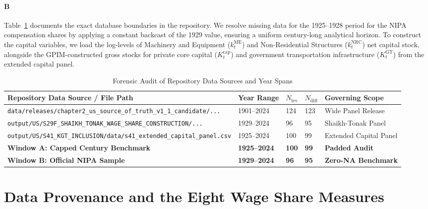\documentclass[11pt,a4paper]{article}
\begin{document}
\paragraph{B}
Table~\ref{tab:sample_audit} documents the exact database boundaries in the repository. We resolve missing data for the 1925--1928 period for the NIPA compensation shares by applying a constant backcast of the 1929 value, ensuring a uniform century-long analytical horizon. To construct the capital variables, we load the log-levels of Machinery and Equipment ($k^{\text{ME}}_t$) and Non-Residential Structures ($k^{\text{NRC}}_t$) net capital stock, alongside the GPIM-constructed gross stocks for private core capital ($K^{\text{cap}}_t$) and government transportation infrastructure ($K^{\text{GT}}_t$) from the extended capital panel.

\begin{table}[h!]
\centering
\small
\caption{Forensic Audit of Repository Data Sources and Year Spans}
\label{tab:sample_audit}
\begin{tabular}{p{7.0cm} p{2.2cm} p{1.6cm} p{1.6cm} p{2.2cm}}
\toprule
\textbf{Repository Data Source / File Path} & \textbf{Year Range} & \textbf{$N_{\text{lev}}$} & \textbf{$N_{\text{diff}}$} & \textbf{Governing Scope} \\
\midrule
\texttt{data/releases/chapter2\_us\_source\_of\_truth\_v1\_1\_candidate/...} & 1901--2024 & 124 & 123 & Wide Panel Release \\
\texttt{output/US/S29F\_SHAIKH\_TONAK\_WAGE\_SHARE\_CONSTRUCTION/...} & 1929--2024 & 96 & 95 & Shaikh-Tonak Panel \\
\texttt{output/US/S41\_KGT\_INCLUSION/data/s41\_extended\_capital\_panel.csv} & 1925--2024 & 100 & 99 & Extended Capital Panel \\
\textbf{Window A: Capped Century Benchmark} & \textbf{1925--2024} & \textbf{100} & \textbf{99} & \textbf{Padded Audit} \\
\textbf{Window B: Official NIPA Sample} & \textbf{1929--2024} & \textbf{96} & \textbf{95} & \textbf{Zero-NA Benchmark} \\
\bottomrule
\end{tabular}
\end{table}

\FloatBarrier
\section{Data Provenance and the Eight Wage Share Measures}
\end{document}
